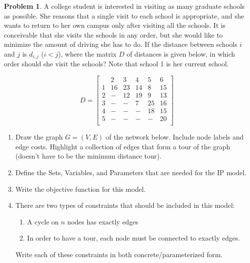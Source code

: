 \documentclass[11pt]{article}
\theoremstyle{definition}
\newtheorem{problem}{Problem}
\newcommand{\answerbox}[3]{%
  \fbox{%
    \begin{minipage}[#1]{#2}
      \hfill\vspace{#3}
    \end{minipage}
  }
}
\newcommand{\catbox}{\answerbox{c}{.5in}{.7cm}}
\begin{document}
\begin{problem}
A college student is interested in visiting as many graduate schools as possible.
She reasons that a single visit to each school is appropriate, and she wants to 
return to her own campus only after visiting all the schools.  It is conceivable that
she visits the schools in any order, but she would like to minimize the amount of
driving she has to do.  If the distance between schools $i$ and $j$ is $d_{i,j}$ ($i < j$), where the 
matrix $D$ of distances is given below, in which order should she visit the schools?
Note that school 1 is her current school.

\[
D = \left[
\begin{array}{c|ccccc}
& 2 & 3 & 4 & 5 & 6 \\
\hline
1 & 16 & 23 & 14 & 8 & 15 \\
2 & - & 12 & 19 & 9 & 13 \\
3 & - & - & 7 & 25 & 16 \\
4 & - & - & - & 18 & 15 \\
5 & - & - & - & - & 20 \\
\end{array}
\right]
\]

\begin{enumerate}[resume]
\item Draw the graph $G = (V,E)$ of the network below.  Include node labels and edge costs.  Highlight a collection of edges that form a tour of the graph (doesn't have to be the minimum distance tour).

\vfill


\item Define the Sets, Variables, and Parameters that are needed for the IP model. 
\vfill \newpage


\item Write the objective function for this model. \vspace{1.25in}

\item There are two types of constraints that should be included in this model:
	\begin{enumerate}
	\item A cycle on $n$ nodes has exactly \catbox edges
	\item In order to have a tour, each node must be connected to exactly \catbox edges.
	\end{enumerate}
Write each of these constraints in both concrete/parameterized form.




\end{enumerate}
\end{problem}
\end{document}
